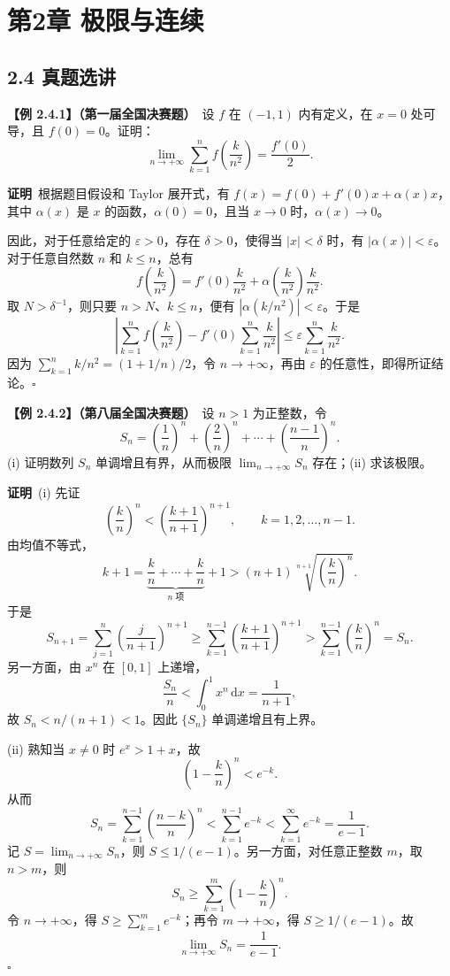 \documentclass[UTF8,a4paper,11pt]{ctexart}
\newcommand{\ex}[2]{\par\medskip\noindent\textbf{【例 #1】（#2）}\ }
\newcommand{\pf}{\par\noindent\textbf{证明}\ }
\begin{document}
\section*{第2章 极限与连续}
\subsection*{2.4 真题选讲}

\ex{2.4.1}{第一届全国决赛题}设 $f$ 在 $(-1,1)$ 内有定义，在 $x=0$ 处可导，且 $f(0)=0$。证明：
\[
\lim_{n\to+\infty}\sum_{k=1}^{n}f\!\left(\frac{k}{n^2}\right)=\frac{f'(0)}{2}.
\]
\pf 根据题目假设和 Taylor 展开式，有 $f(x)=f(0)+f'(0)x+\alpha(x)x$，其中 $\alpha(x)$ 是 $x$ 的函数，$\alpha(0)=0$，且当 $x\to0$ 时，$\alpha(x)\to0$。

因此，对于任意给定的 $\varepsilon>0$，存在 $\delta>0$，使得当 $|x|<\delta$ 时，有 $|\alpha(x)|<\varepsilon$。对于任意自然数 $n$ 和 $k\le n$，总有
\[
f\!\left(\frac{k}{n^2}\right)=f'(0)\frac{k}{n^2}+\alpha\!\left(\frac{k}{n^2}\right)\frac{k}{n^2}.
\]
取 $N>\delta^{-1}$，则只要 $n>N$、$k\le n$，便有 $|\alpha(k/n^2)|<\varepsilon$。于是
\[
\left|\sum_{k=1}^{n}f\!\left(\frac{k}{n^2}\right)-f'(0)\sum_{k=1}^{n}\frac{k}{n^2}\right|
\le\varepsilon\sum_{k=1}^{n}\frac{k}{n^2}.
\]
因为 $\sum_{k=1}^{n}k/n^2=(1+1/n)/2$，令 $n\to+\infty$，再由 $\varepsilon$ 的任意性，即得所证结论。\hfill$\square$

\ex{2.4.2}{第八届全国决赛题}设 $n>1$ 为正整数，令
\[
S_n=\left(\frac1n\right)^n+\left(\frac2n\right)^n+\cdots+\left(\frac{n-1}{n}\right)^n.
\]
(i) 证明数列 $S_n$ 单调增且有界，从而极限 $\lim_{n\to+\infty}S_n$ 存在；(ii) 求该极限。

\pf (i) 先证
\[
\left(\frac{k}{n}\right)^n<\left(\frac{k+1}{n+1}\right)^{n+1},\qquad k=1,2,\ldots,n-1.
\]
由均值不等式，
\[
k+1=\underbrace{\frac{k}{n}+\cdots+\frac{k}{n}}_{n\text{ 项}}+1
>(n+1)\sqrt[n+1]{\left(\frac{k}{n}\right)^n}.
\]
于是
\[
S_{n+1}=\sum_{j=1}^{n}\left(\frac{j}{n+1}\right)^{n+1}
\ge\sum_{k=1}^{n-1}\left(\frac{k+1}{n+1}\right)^{n+1}
>\sum_{k=1}^{n-1}\left(\frac{k}{n}\right)^n=S_n.
\]
另一方面，由 $x^n$ 在 $[0,1]$ 上递增，
\[
\frac{S_n}{n}<\int_0^1 x^n\,\mathrm dx=\frac1{n+1},
\]
故 $S_n<n/(n+1)<1$。因此 $\{S_n\}$ 单调递增且有上界。

(ii) 熟知当 $x\ne0$ 时 $e^x>1+x$，故
\[
\left(1-\frac{k}{n}\right)^n<e^{-k}.
\]
从而
\[
S_n=\sum_{k=1}^{n-1}\left(\frac{n-k}{n}\right)^n
<\sum_{k=1}^{n-1}e^{-k}<\sum_{k=1}^{\infty}e^{-k}=\frac1{e-1}.
\]
记 $S=\lim_{n\to+\infty}S_n$，则 $S\le1/(e-1)$。另一方面，对任意正整数 $m$，取 $n>m$，则
\[
S_n\ge\sum_{k=1}^{m}\left(1-\frac{k}{n}\right)^n.
\]
令 $n\to+\infty$，得 $S\ge\sum_{k=1}^{m}e^{-k}$；再令 $m\to+\infty$，得 $S\ge1/(e-1)$。故
\[
\lim_{n\to+\infty}S_n=\frac1{e-1}.
\]\hfill$\square$
\end{document}
